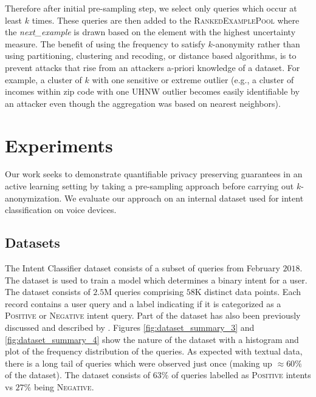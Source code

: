 \documentclass[letterpaper]{article}
\begin{document}
Therefore after initial pre-sampling step, we select only queries which occur at least $k$ times. These queries are then added to the \textsc{RankedExamplePool} where the \textit{next\_example} is drawn based on the element with the highest uncertainty measure. The benefit of using the frequency to satisfy $k$-anonymity rather than using partitioning, clustering and recoding, or distance based algorithms, is to prevent attacks that rise from an attackers a-priori knowledge of a dataset. For example, a cluster of $k$ with one sensitive or extreme outlier (e.g., a cluster of incomes within zip code with one UHNW outlier becomes easily identifiable by an attacker even though the aggregation was based on nearest neighbors).



\section{Experiments}

Our work seeks to demonstrate quantifiable privacy preserving guarantees in an active learning setting by taking a pre-sampling approach before carrying out $k$-anonymization. We evaluate our approach on an internal dataset used for intent classification on voice devices.

\subsection{Datasets}
The Intent Classifier dataset consists of a subset of queries from February $2018$. The dataset is used to train a model which determines a binary intent for a user. The dataset consists of $2.5$M queries comprising $58$K distinct data points. Each record contains a user query and a label indicating if it is categorized as a \textsc{Positive} or \textsc{Negative} intent query. Part of the dataset has also been previously discussed and described by \cite{yang2018leveraging}. Figures \ref{fig:dataset_summary_3} and \ref{fig:dataset_summary_4} show the nature of the dataset with a histogram and plot of the frequency distribution of the queries. As expected with textual data, there is a long tail of queries which were observed just once (making up $\approx 60\%$ of the dataset). The dataset consists of $63\%$ of queries labelled as \textsc{Positive} intents vs $27\%$ being \textsc{Negative}.
\end{document}
